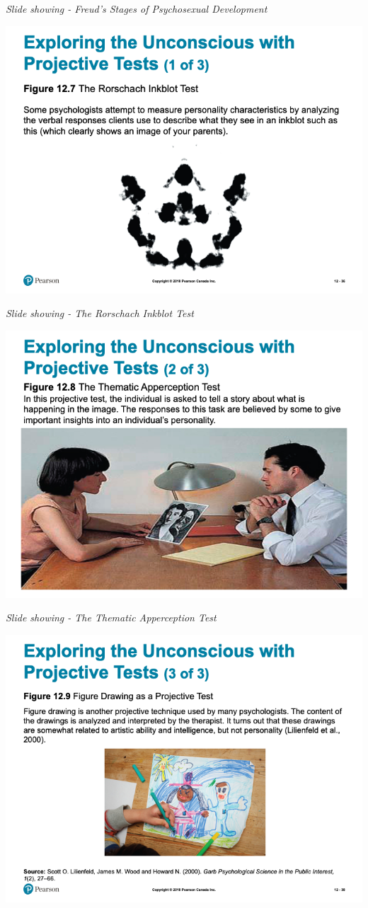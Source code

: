 \documentclass[
]{book}
\begin{document}
\begin{reflect}
\emph{Slide showing - Freud's Stages of Psychosexual Development}

\includegraphics{assets/unit_5/slide_36.png}

\emph{Slide showing - The Rorschach Inkblot Test}

\includegraphics{assets/unit_5/slide_37.png}

\emph{Slide showing - The Thematic Apperception Test}

\includegraphics{assets/unit_5/slide_38.png}


\end{reflect}
\end{document}
